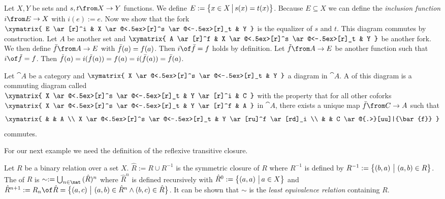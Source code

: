\begin{example}
  Let $X, Y$ be sets and $s, t \from X \to Y$ functions.
  We define $E := \bigl \{ x \in X \,\big|\, s(x)=t(x) \bigr \}$.
  Because $E \subseteq X$ we can define the \emph{inclusion function} $i \from E \to X$ with $i(e) := e$.
  Now we show that the fork
  $ \xymatrix{
    E \ar[r]^i & X \ar@<.5ex>[r]^s \ar@<-.5ex>[r]_t & Y
  } $
  is the equalizer of $s$ and $t$. This diagram commutes by construction.
  Let $A$ be another set and
  $ \xymatrix{
    A \ar[r]^f & X \ar@<.5ex>[r]^s \ar@<-.5ex>[r]_t & Y
  } $
  be another fork.
  We then define $\fbar \from A \to E$ with $\bar{f}(a) = f(a)$.
  Then $i \of \fbar = f$ holds by definition.
  Let $\ftilde \from A \to E$ be another function such that $i \of \ftilde = f$.
  Then $\tilde{f}(a) = i (\tilde{f}(a)) = f(a) = i (\bar{f}(a)) = \bar{f}(a)$.
\end{example}


\begin{definition}[Coequalizer]
  \label{def:coequa}
  Let $\cat{A}$ be a category and
  $ \xymatrix{
    X \ar@<.5ex>[r]^s \ar@<-.5ex>[r]_t & Y
  } $
  a diagram in $\cat{A}$.
  A  of this diagram is a commuting diagram called  \\
  $ \xymatrix{
    X \ar@<.5ex>[r]^s \ar@<-.5ex>[r]_t & Y \ar[r]^i & C
  } $
  with the property that for all other coforks
  $ \xymatrix{
    X \ar@<.5ex>[r]^s \ar@<-.5ex>[r]_t & Y \ar[r]^f & A
  } $
  in $\cat{A}$, there exists a unique map $\bar{f}\from C \to A$ such that
  \[ \xymatrix{
    & & A  \\
    X \ar@<.5ex>[r]^s \ar@<-.5ex>[r]_t & Y \ar[ru]^f \ar[rd]_i \\
    & & C \ar@{.>}[uu]|{\bar{f}}
  } \]
  commutes.
\end{definition}

For our next example we need the definition of the reflexive transitive closure.

\begin{definition}
  Let $R$ be a binary relation over a set $X$.
  $\hat{R} := R \cup R^{-1}$ is the symmetric closure of $R$ where $R^{-1}$ is defined by
  $R^{-1} := \bigl \{ \left( b , a \right) \,\big|\, \left( a , b \right) \in R \bigr \}$.
  The  of $R$ is $\sim := \bigcup_{n\in\nat} {(\hat{R})^n}$
  where ${\hat R}^n$ is defined recursively with
  ${\hat R}^0 := \bigl \{ \left( a , a \right) \,\big|\, a \in X \bigr \}$ and
  ${\hat R}^{n+1} := R_n \of \hat R = \setMap{\pair{a}{c}}{\pair{a}{b} \in {\hat R}^n \land \pair{b}{c} \in \hat R}$.
  It can be shown that $\sim$ is the \emph{least equivalence relation} containing $R$.
\end{definition}

